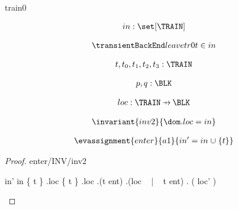 \documentclass[12pt]{amsart}
\title{}
\author{}
\date{} %
\begin{document}
\maketitle
\tableofcontents


\begin{machine}{train0}


%
	\begin{align*}
\variable{		in : \set[\TRAIN]}
	\end{align*}
%



\begin{align*}
\transient{leave}{tr0}
{	t \in in	}
\end{align*}

\begin{align*}
\dummy{	t,t_0,t_1,t_2,t_3 : \TRAIN}
\end{align*}

\begin{align*}
\dummy{	p,q : \BLK}
\end{align*}


\begin{align*}
\variable{	loc : \TRAIN \pfun \BLK}
\end{align*}

\begin{align*}
\invariant{inv2}
{	\dom . loc = in	}
\end{align*}

\begin{align*}
\evassignment{enter}{a1}
{	in' = in \bunion \{ t \}	}
\end{align*}

\begin{proof}{enter/INV/inv2}
	\begin{calculation}
		in'
	\hint{=}{ \ref{a1} }
		in \bunion \{ t \}
	\hint{=}{ \ref{inv2} }
		\dom.loc \bunion \{ t \}
		\dom.loc \bunion \dom.(t \tfun ent)
		\dom.(loc ~  | ~  t \tfun ent)
	\hint{=}{ \ref{a2} }
		\dom. ( loc' )
	\end{calculation}
\end{proof}


\end{machine}
\end{document}
